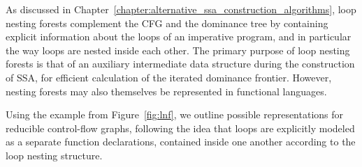 As discussed in
Chapter~\ref{chapter:alternative_ssa_construction_algorithms}, loop
nesting forests complement the CFG and the dominance tree by
containing explicit information about the loops of an imperative
program, and in particular the way loops are nested inside each other.
The primary purpose of loop nesting forests is that of an auxiliary
intermediate data structure during the construction of SSA, for
efficient calculation of the iterated dominance frontier. However,
nesting forests may also themselves be represented in functional
languages.

Using the example from Figure~\ref{fig:lnf}, we outline possible
representations for reducible control-flow graphs, following the idea
that loops are explicitly modeled as a separate function declarations,
contained inside one another according to the loop nesting structure.

